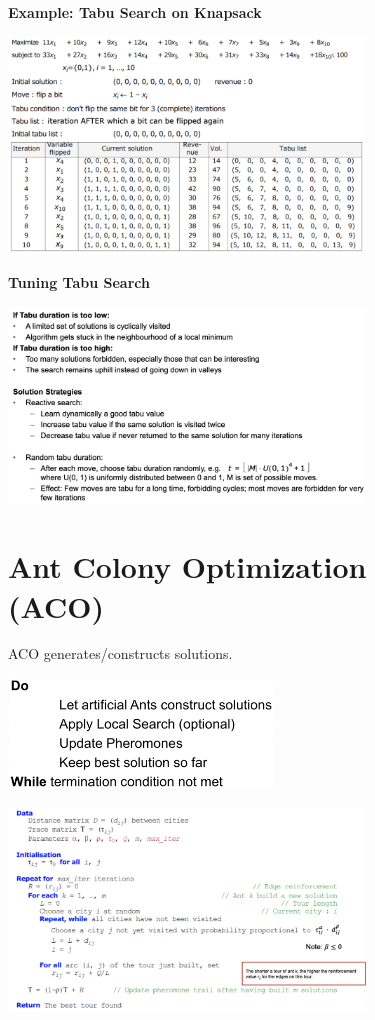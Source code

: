 \documentclass[10pt,a4paper,twocolumn]{article}
\begin{document}
\newpage
\textbf{Example: Tabu Search on Knapsack}
\begin{center}
\includegraphics[width=9.5cm]{images/tabu-search-on-knapsack}
\end{center}

\textbf{Tuning Tabu Search}
\begin{center}
\includegraphics[width=9.5cm]{images/tuning-tabu-search}
\end{center}

\newpage
\section{Ant Colony Optimization\\ (ACO)}
ACO generates/constructs solutions. 


\begin{center}
	\includegraphics[width=7cm]{images/peseudo-simple-aco}
\end{center}

\begin{center}
	\includegraphics[width=9.5cm]{images/peseudo-aco}
\end{center}
\end{document}
